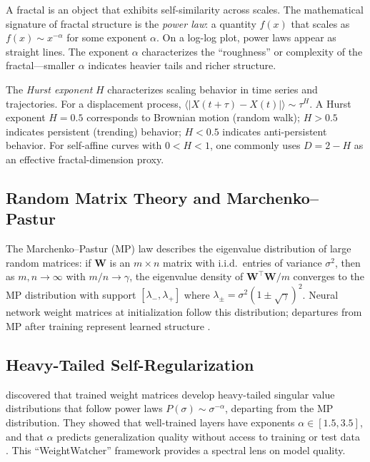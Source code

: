 \documentclass[11pt,a4paper]{article}
\begin{document}
A fractal is an object that exhibits self-similarity across scales. The mathematical signature of fractal structure is the \emph{power law}: a quantity $f(x)$ that scales as $f(x) \sim x^{-\alpha}$ for some exponent $\alpha$. On a log-log plot, power laws appear as straight lines. The exponent $\alpha$ characterizes the ``roughness'' or complexity of the fractal---smaller $\alpha$ indicates heavier tails and richer structure.

The \emph{Hurst exponent} $H$ characterizes scaling behavior in time series and trajectories. For a displacement process, $\langle|X(t+\tau) - X(t)|\rangle \sim \tau^H$. A Hurst exponent $H = 0.5$ corresponds to Brownian motion (random walk); $H > 0.5$ indicates persistent (trending) behavior; $H < 0.5$ indicates anti-persistent behavior. For self-affine curves with $0 < H < 1$, one commonly uses $D = 2 - H$ as an effective fractal-dimension proxy.

\subsection{Random Matrix Theory and Marchenko--Pastur}

The Marchenko--Pastur (MP) law \citep{marchenko1967distribution} describes the eigenvalue distribution of large random matrices: if $\mathbf{W}$ is an $m \times n$ matrix with i.i.d.\ entries of variance $\sigma^2$, then as $m, n \to \infty$ with $m/n \to \gamma$, the eigenvalue density of $\mathbf{W}^\top\mathbf{W}/m$ converges to the MP distribution with support $[\lambda_-, \lambda_+]$ where $\lambda_\pm = \sigma^2(1 \pm \sqrt{\gamma})^2$. Neural network weight matrices at initialization follow this distribution; departures from MP after training represent learned structure \citep{pennington2017nonlinear}.

\subsection{Heavy-Tailed Self-Regularization}

\citet{martin2019implicit} discovered that trained weight matrices develop heavy-tailed singular value distributions that follow power laws $P(\sigma) \sim \sigma^{-\alpha}$, departing from the MP distribution. They showed that well-trained layers have exponents $\alpha \in [1.5, 3.5]$, and that $\alpha$ predicts generalization quality without access to training or test data \citep{martin2021predicting, martin2021heavy}. This ``WeightWatcher'' framework provides a spectral lens on model quality.
\end{document}
